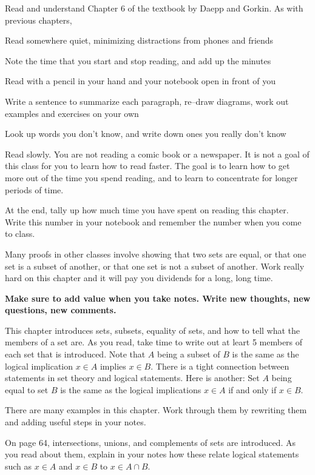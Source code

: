 
\noindent
Read and understand Chapter 6 of the textbook by Daepp and Gorkin.
As with previous chapters,
{\small
\blist{0.0in}
\item Read somewhere quiet, minimizing distractions from phones and friends
\item Note the time that you start and stop reading, and add up the minutes
\item Read with a pencil in your hand and your notebook open in front of you
\item Write a sentence to summarize each paragraph, re--draw diagrams, work out examples and exercises on your own
\item Look up words you don't know, and write down ones you really don't know
\item Read slowly.  You are not reading a comic book or a newspaper.  It is not a goal of this class for you to learn how to read faster.  The goal is to learn how to get more out of the time you spend reading, and to learn to concentrate for longer periods of time.
\item At the end, tally up how much time you have spent on reading this chapter.
Write this number in your notebook and remember the number when you come to class.
\elist
}

Many proofs in other classes involve showing that two sets are equal, or that one set is a subset of another, or that one set is not a subset of another.
Work really hard on this chapter and it will pay you dividends for a long, long time.

{\bf Make sure to add value when you take notes.
Write new thoughts, new questions, new comments.}

This chapter introduces sets, subsets, equality of sets, and how to tell what the members of a set are.
As you read, take time to write out at leart 5 members of each set that is introduced.
Note that $A$ being a subset of $B$ is the same as the logical implication $x \in A$ implies $x \in B$.
There is a tight connection between statements in set theory and logical statements.
Here is another:  Set $A$ being equal to set $B$ is the same as the logical implications $x \in A$ if and only if $x \in B$.

There are many examples in this chapter.
Work through them by rewriting them and adding useful steps in your notes.

On page 64, intersections, unions, and complements of sets are introduced.
As you read about them, explain in your notes how these relate logical statements such as $x \in A$ and $x \in B$ to $x \in A \cap B$.

